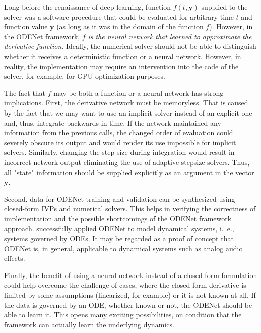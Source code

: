 Long before the renaissance of deep learning, function $f(t, \pmb{y})$ supplied to the solver was a software procedure that could be evaluated for arbitrary time $t$ and function value $\pmb{y}$ (as long as it was in the domain of the function $f$). However, in the ODENet framework, $f$ \emph{is the neural network that learned to approximate the derivative function}. Ideally, the numerical solver should not be able to distinguish whether it receives a deterministic function or a neural network. However, in reality, the implementation may require an intervention into the code of the solver, for example, for \ac{GPU} optimization purposes.

The fact that $f$ may be both a function or a neural network has strong implications. First, the derivative network must be memoryless. That is caused by the fact that we may want to use an implicit solver instead of an explicit one and, thus, integrate backwards in time. If the network maintained any information from the previous calls, the changed order of evaluation could severely obscure its output and would render its use impossible for implicit solvers. Similarly, changing the step size during integration would result in incorrect network output eliminating the use of adaptive-stepsize solvers. Thus, all "state" information should be supplied explicitly as an argument in the vector $\pmb{y}$.

Second, data for ODENet training and validation can be synthesized using closed-form \acp{IVP} and numerical solvers. This helps in verifying the correctness of implementation and the possible shortcomings of the ODENet framework approach.
\cite{Karlsson2019} successfully applied ODENet to model dynamical systems, i.\ e., systems governed by \acp{ODE}. It may be regarded as a proof of concept that ODENet is, in general, applicable to dynamical systems such as analog audio effects.

Finally, the benefit of using a neural network instead of a closed-form formulation could help overcome the challenge of cases, where the closed-form derivative is limited by some assumptions (linearized, for example) or it is not known at all. If the data is governed by an \ac{ODE}, whether known or not, the ODENet should be able to learn it. This opens many exciting possibilities, on condition that the framework can actually learn the underlying dynamics.
